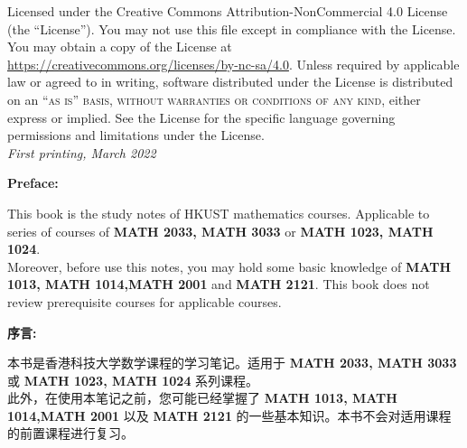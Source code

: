 \documentclass[
	UTF-8,
	11pt, %
	a4paper, %
]{LegrandOrangeBook}
\begin{document}
\noindent Licensed under the Creative Commons Attribution-NonCommercial 4.0 License (the ``License''). You may not use this file except in compliance with the License. You may obtain a copy of the License at \url{https://creativecommons.org/licenses/by-nc-sa/4.0}. Unless required by applicable law or agreed to in writing, software distributed under the License is distributed on an \textsc{``as is'' basis, without warranties or conditions of any kind}, either express or implied. See the License for the specific language governing permissions and limitations under the License.\\ %

\noindent \textit{First printing, March 2022} %

\newpage


\thispagestyle{empty} %

\begin{center}
    \textbf{\LARGE Preface:}
\end{center}

This book is the study notes of HKUST mathematics courses. Applicable to 
series of courses of \textbf{MATH 2033, MATH 3033} or \textbf{MATH 1023, MATH 1024}. \\

Moreover, before use this notes, you may hold some basic knowledge of \textbf{MATH 1013, MATH 1014,MATH 2001} and 
\textbf{MATH 2121}. This book does not review prerequisite courses for applicable courses.\\

\begin{center}
    \textbf{\LARGE 序言:}
\end{center}

本书是香港科技大学数学课程的学习笔记。适用于 
\textbf{MATH 2033, MATH 3033} 或 \textbf{MATH 1023, MATH 1024} 系列课程。 \\

此外，在使用本笔记之前，您可能已经掌握了 \textbf{MATH 1013, MATH 1014,MATH 2001} 以及 
\textbf{MATH 2121} 的一些基本知识。本书不会对适用课程的前置课程进行复习。\\
\end{document}
